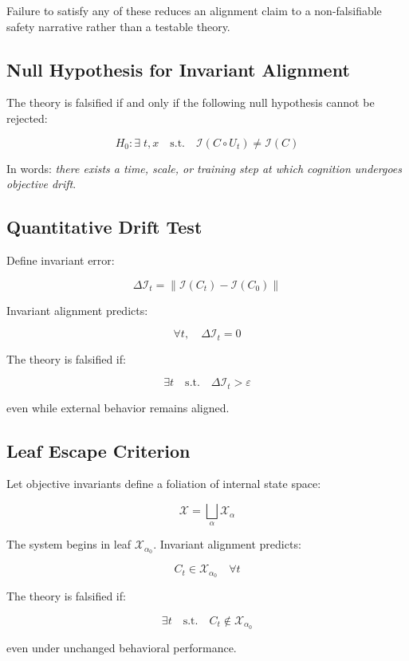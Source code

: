 \documentclass[11pt,a4paper]{article}
\theoremstyle{plain}
\theoremstyle{definition}
\theoremstyle{remark}
\numberwithin{equation}{section}
\begin{document}
Failure to satisfy any of these reduces an alignment claim to a non-falsifiable safety narrative rather than a testable theory.

\subsection{Null Hypothesis for Invariant Alignment}

The theory is falsified if and only if the following null hypothesis cannot be rejected:

\[
H_0: \exists \; t, x \quad \text{s.t.} \quad \mathcal{I}(C \circ U_t) \neq \mathcal{I}(C)
\]

In words: \emph{there exists a time, scale, or training step at which cognition undergoes objective drift}.

\subsection{Quantitative Drift Test}

Define invariant error:

\[
\Delta \mathcal{I}_t = \|\mathcal{I}(C_t) - \mathcal{I}(C_0)\|
\]

Invariant alignment predicts:

\[
\forall t, \quad \Delta \mathcal{I}_t = 0
\]

The theory is falsified if:

\[
\exists t \quad \text{s.t.} \quad \Delta \mathcal{I}_t > \varepsilon
\]

even while external behavior remains aligned.

\subsection{Leaf Escape Criterion}

Let objective invariants define a foliation of internal state space:

\[
\mathcal{X} = \bigsqcup_{\alpha} \mathcal{X}_\alpha
\]

The system begins in leaf $\mathcal{X}_{\alpha_0}$.  
Invariant alignment predicts:

\[
C_t \in \mathcal{X}_{\alpha_0} \quad \forall t
\]

The theory is falsified if:

\[
\exists t \quad \text{s.t.} \quad C_t \notin \mathcal{X}_{\alpha_0}
\]

even under unchanged behavioral performance.
\end{document}
